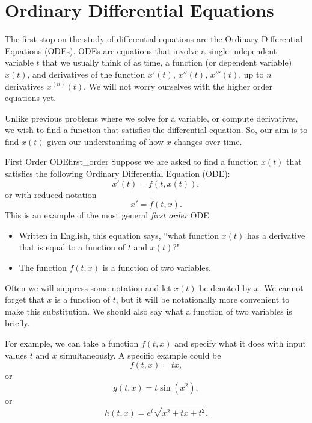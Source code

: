         \section{Ordinary Differential Equations}

        The first stop on the study of differential equations are the Ordinary Differential Equations  (ODEs).  ODEs are equations that involve a single independent variable $t$ that we usually think of as time, a function (or dependent variable) $x(t)$, and derivatives of the function $x'(t)$, $x''(t)$, $x'''(t)$, up to $n$ derivatives $x^{(n)}(t)$.  We will not worry ourselves with the higher order equations yet.

        Unlike previous problems where we solve for a variable, or compute derivatives, we wish to find a function that satisfies the differential equation.  So, our aim is to find $x(t)$ given our understanding of how $x$ changes over time.

        \begin{ex}{First Order ODE}{first_order}
        Suppose we are asked to find a function $x(t)$ that satisfies the following Ordinary Differential Equation (ODE):
        \[
        x'(t) = f(t,x(t)),
        \]
        or with reduced notation
        \[
        x'=f(t,x).
        \]
        This is an example of the most general \emph{first order} ODE.
        \begin{itemize}
            \item Written in English, this equation says, ``what function $x(t)$ has a derivative that is equal to a function of $t$ and $x(t)$?"
            \item The function $f(t,x)$ is a function of two variables.
        \end{itemize}
        \end{ex}

        \noindent Often we will suppress some notation and let $x(t)$ be denoted by $x$.  We cannot forget that $x$ is a function of $t$, but it will be notationally more convenient to make this substitution. We should also say what a function of two variables is briefly.

        For example, we can take a function $f(t,x)$ and specify what it does with input values $t$ and $x$ simultaneously. A specific example could be
        \[
        f(t,x)=tx,
        \]
        or
        \[
        g(t,x)= t\sin\left(x^2\right),
        \]
        or
        \[
        h(t,x)= e^{t}\sqrt{x^2+tx+t^2}.
        \]

